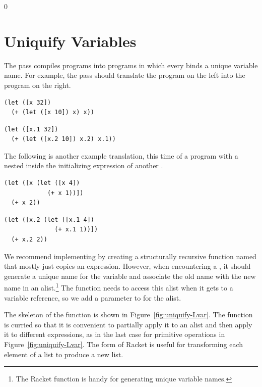 \documentclass[7x10]{TimesAPriori_MIT}%
\def\racketEd{0}
\def\edition{1}
\begin{document}
{\if\edition\racketEd  
\section{Uniquify Variables}
\label{sec:uniquify-Lvar}

The  pass compiles \LangVar{} programs into \LangVar{}
programs in which every  binds a unique variable name. For
example, the  pass should translate the program on the
left into the program on the right. 
\begin{transformation}
\begin{lstlisting}
(let ([x 32])
  (+ (let ([x 10]) x) x))
\end{lstlisting}
\compilesto
\begin{lstlisting}
(let ([x.1 32])
  (+ (let ([x.2 10]) x.2) x.1))
\end{lstlisting}
\end{transformation}
The following is another example translation, this time of a program
with a  nested inside the initializing expression of another
.
\begin{transformation}
\begin{lstlisting}
(let ([x (let ([x 4])
            (+ x 1))])
  (+ x 2))
\end{lstlisting}
\compilesto
\begin{lstlisting}
(let ([x.2 (let ([x.1 4])
              (+ x.1 1))])
  (+ x.2 2))
\end{lstlisting}
\end{transformation}

We recommend implementing  by creating a structurally
recursive function named  that mostly just copies
an expression. However, when encountering a , it should
generate a unique name for the variable and associate the old name
with the new name in an alist.\footnote{The Racket function
   is handy for generating unique variable names.} The
 function needs to access this alist when it gets
to a variable reference, so we add a parameter to 
for the alist.

The skeleton of the  function is shown in
Figure~\ref{fig:uniquify-Lvar}.  The function is curried so that it is
convenient to partially apply it to an alist and then apply it to
different expressions, as in the last case for primitive operations in
Figure~\ref{fig:uniquify-Lvar}.  The
%
\href{https://docs.racket-lang.org/reference/for.html#%28form._%28%28lib._racket%2Fprivate%2Fbase..rkt%29._for%2Flist%29%29}{\key{for/list}}
%
form of Racket is useful for transforming each element of a list to
produce a new list.

}
\end{document}
